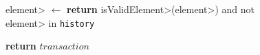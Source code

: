 \begin{figure}[t!]
\begin{adjustbox}{minipage=[t]{\columnwidth}}
\begin{algorithm}[H]
\begin{algorithmic}[1]
            \label{alg:van_is_valid_tx}
                \State \<element> $\leftarrow$ 
                \State \textbf{return} \<isValidElement>(\<element>) and not \<element> in \texttt{history}
            \EndFunction
            
            \label{alg:van_get_element}
                \State \textbf{return} $transaction$
            \EndFunction
        \end{algorithmic}
      \end{algorithm}
	\end{adjustbox}
  \end{figure}
